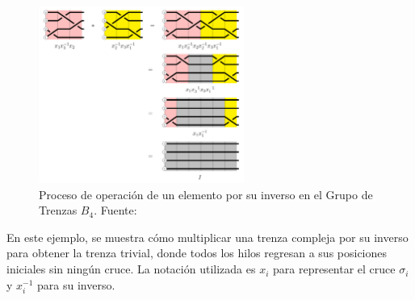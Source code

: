 \begin{figure}[h!]
    \centering
    \includegraphics[width=0.6\textwidth]{figures/chapters/1_def_grupo/elemento_inverso2.png}
    \caption{Proceso de operación de un elemento por su inverso en el Grupo de Trenzas $B_4$. Fuente: \cite{ArithmeticBraids}}
    \label{fig:elemento_inverso_proceso}
\end{figure}

En este ejemplo, se muestra cómo multiplicar una trenza compleja por su inverso para obtener la trenza trivial, donde todos los hilos regresan a sus posiciones iniciales sin ningún cruce. La notación utilizada es \(x_i\) para representar el cruce \(\sigma_i\) y \(x_i^{-1}\) para su inverso.

